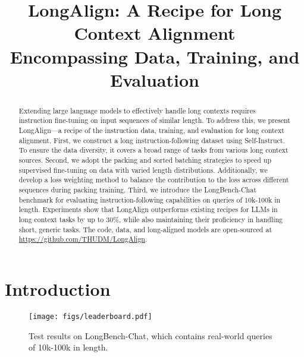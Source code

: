 \title{LongAlign: A Recipe for Long Context Alignment\\
Encompassing Data, Training, and Evaluation}



\maketitle

\renewcommand{\thefootnote}{\fnsymbol{footnote}}
\renewcommand{\thefootnote}{\arabic{footnote}}

\thispagestyle{plain}
\pagestyle{plain}

\begin{abstract}

Extending large language models to effectively handle long contexts requires instruction fine-tuning on input sequences of similar length. 
To address this, we present LongAlign---a recipe of the instruction data, training, and evaluation for long context alignment. 
First, we construct a long instruction-following dataset using Self-Instruct. 
To ensure the data diversity, it covers a broad range of tasks from various long context sources. 
Second, we adopt the packing and sorted batching strategies to speed up supervised fine-tuning on data with varied length distributions. 
Additionally, we develop a loss weighting method to balance the contribution to the loss across different sequences during packing training. 
Third, we introduce the LongBench-Chat  benchmark for evaluating instruction-following capabilities on queries of 10k-100k in length.
Experiments show that LongAlign outperforms existing recipes for LLMs in long context tasks by up to 30\%, while also maintaining their proficiency in handling short, generic tasks.
The code, data, and long-aligned models are open-sourced at \url{https://github.com/THUDM/LongAlign}.

\end{abstract}
\section{Introduction}
\label{sec:intro}

\begin{figure}[t]
    \centering
    \texttt{[image: figs/leaderboard.pdf]}
    \caption{Test results on LongBench-Chat, which contains real-world queries of 10k-100k in length\protect\footnotemark.}
    \label{fig:leaderboard}
\end{figure}


